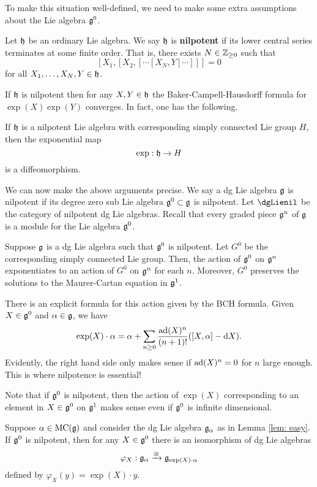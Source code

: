 \documentclass[11pt]{amsart}
\begin{document}
To make this situation well-defined, we need to make some extra assumptions about the Lie algebra $\mathfrak g^0$. 

\begin{dfn}
Let $\mathfrak h$ be an ordinary Lie algebra.
We say $\mathfrak h$ is {\bf nilpotent} if its lower central series terminates at some finite order. 
That is, there exists $N \in \mathbb Z_{\geq 0}$ such that 
\[
[X_1,[X_2,[\cdots[X_N,Y]\cdots]]] = 0
\]
for all $X_1,\ldots,X_N, Y \in \mathfrak h$.
\end{dfn}

If $\mathfrak h$ is nilpotent then for any $X, Y \in \mathfrak h$ the Baker-Campell-Hausdorff formula for $\exp(X)\exp(Y)$ converges. 
In fact, one has the following.

\begin{prop}
If $\mathfrak h$ is a nilpotent Lie algebra with corresponding simply connected Lie group $H$, then the exponential map
\[
\exp : \mathfrak h \to H
\] 
is a diffeomorphism.
\end{prop}

We can now make the above arguments precise. 
We say a dg Lie algebra $\mathfrak g$ is nilpotent if its degree zero sub Lie algebra $\mathfrak g^0 \subset \mathfrak g$ is nilpotent. 
Let $\dgLienil$ be the category of nilpotent dg Lie algebras.
Recall that every graded piece $\mathfrak g^n$ of $\mathfrak g$ is a module for the Lie algebra $\mathfrak g^0$. 

\begin{lem}
Suppose $\mathfrak g$ is a dg Lie algebra such that $\mathfrak g^0$ is nilpotent.
Let $G^0$ be the corresponding simply connected Lie group. 
Then, the action of $\mathfrak g^0$ on $\mathfrak g^n$ exponentiates to an action of $G^0$ on $\mathfrak g^n$ for each $n$. 
Moreover, $G^0$ preserves the solutions to the Maurer-Cartan equation in $\mathfrak g^1$.
\end{lem}

There is an explicit formula for this action given by the BCH formula. 
Given $X \in \mathfrak g^0$ and $\alpha \in \mathfrak g$, we have
\[
\exp(X) \cdot \alpha = \alpha + \sum_{n \geq 0} \frac{{\rm ad}(X)^n}{(n+1)!} ([X, \alpha] - {\rm d} X) .
\] 
Evidently, the right hand side only makes sense if ${\rm ad}(X)^n = 0$ for $n$ large enough.
This is where nilpotence is essential!

\begin{rmk}
Note that if $\mathfrak g^0$ is nilpotent, then the action of $\exp(X)$ corresponding to an element in $X \in \mathfrak g^0$ on $\mathfrak g^1$ makes sense even if $\mathfrak g^0$ is infinite dimensional. 
\end{rmk}

\begin{lem}
Suppose $\alpha \in {\rm MC}(\mathfrak g)$ and consider the dg Lie algebra $\mathfrak g_\alpha$ as in Lemma \ref{lem: easy}. 
If $\mathfrak g^0$ is nilpotent, then for any $X \in \mathfrak g^0$ there is an isomorphism of dg Lie algebras
\[
\varphi_X : \mathfrak g_{\alpha} \xrightarrow{\cong} \mathfrak g_{\exp(X) \cdot \alpha}
\]
defined by $\varphi_X(y) = \exp(X) \cdot y$. 
\end{lem}
\end{document}
